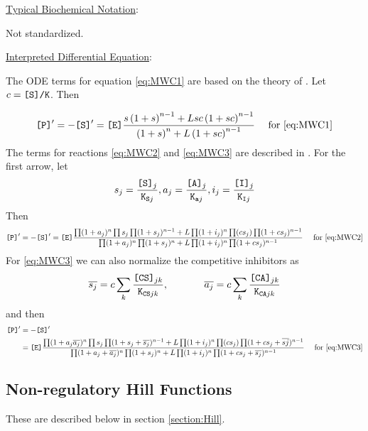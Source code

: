 \underline{Typical Biochemical Notation}: 

Not standardized. 

\underline{Interpreted Differential Equation}:

The ODE terms for equation \eqref{eq:MWC1} are based on the theory of \cite{MWC}. Let $c=\text{\tt{[S]/K}}$. Then 

\begin{align*}
\text{\tt{[P]}}' = -\text{\tt{[S]}}' &= \text{\tt{[E]}}\dfrac{{s \left(1 + s\right)^{n-1}} + {L s c \left(1 + s c\right)^{n-1}}}
              {\left(1 + s\right)^{n} + L \left(1 + {s c}\right)^{n-1}}
              &\text{ for \eqref{eq:MWC1}}
\end{align*}
The terms for reactions \eqref{eq:MWC2} and \eqref{eq:MWC3} are described in \cite{GMWC}. For the first arrow, let 
\begin{align*}
s_j = \dfrac{\text{\tt{[S]}}_j}{\text{\tt{K}}_{\text{\tt{S}}j}}, 
a_j = \dfrac{\text{\tt{[A]}}_j}{\text{\tt{K}}_{\text{\tt{a}}j}}, 
i_j = \dfrac{\text{\tt{[I]}}_j}{\text{\tt{K}}_{\text{\tt{I}}j}}
\end{align*}
Then
\begin{align*}
\text{\tt{[P]}}' = -\text{\tt{[S]}}' &= \text{\tt{[E]}}\dfrac{
{\prod(1+a_j)^n \prod s_j \prod(1 + s_j)^{n-1}} + {L \prod(1+i_j)^n \prod (cs_j ) \prod (1 + c s_j)^{n-1}}}
              {\prod(1+a_j)^n\prod (1 + s_j)^{n} + L \prod(1+i_j)^n\prod(1 + {c s_j})^{n-1}}
              &\text{ for \eqref{eq:MWC2}}
\end{align*}
For \eqref{eq:MWC3} we can also normalize the competitive inhibitors as
\begin{align*}
&\overline{s_j} = c \sum_k \dfrac{\text{\tt{[CS]}}_{jk}}{\text{\tt{K}}_{\text{\tt{CS}}jk}},\hspace{.5in}
\overline{a_j} = c \sum_k \dfrac{\text{\tt{[CA]}}_{jk}}{\text{\tt{K}}_{\text{\tt{CA}}jk}}\\
\end{align*}
and then
\begin{align*}
\text{\tt{[P]}}' &= -\text{\tt{[S]}}' \\
&= \text{\tt{[E]}}\dfrac{
{\prod(1+a_j\overline{a_j})^n \prod s_j \prod(1 + s_j+\overline{s_j})^{n-1}} + {L \prod(1+i_j)^n \prod (cs_j ) \prod (1 + c s_j + \overline{sj})^{n-1}}}
              {\prod(1+a_j+\overline{a_j})^n\prod (1 + s_j)^{n} + L \prod(1+i_j)^n\prod(1 + {c s_j} + \overline{s_j})^{n-1}}
              &\text{ for \eqref{eq:MWC3}}
\end{align*}

 
\subsection{Non-regulatory Hill Functions}
These are described below in section \ref{section:Hill}.


